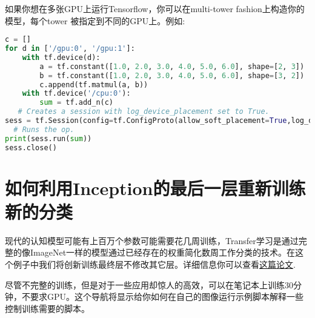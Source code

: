 如果你想在多张GPU上运行Tensorflow，你可以在multi-tower fashion上构造你的模型，每个tower 被指定到不同的GPU上。例如:
\begin{lstlisting}[language=Python]
c = []
for d in ['/gpu:0', '/gpu:1']:
    with tf.device(d):
        a = tf.constant([1.0, 2.0, 3.0, 4.0, 5.0, 6.0], shape=[2, 3])
        b = tf.constant([1.0, 2.0, 3.0, 4.0, 5.0, 6.0], shape=[3, 2])
        c.append(tf.matmul(a, b))
    with tf.device('/cpu:0'):
        sum = tf.add_n(c)
   # Creates a session with log_device_placement set to True.
sess = tf.Session(config=tf.ConfigProto(allow_soft_placement=True,log_device_placement=True))
  # Runs the op.
print(sess.run(sum))
sess.close()
\end{lstlisting}
\section{如何利用Inception的最后一层重新训练新的分类}
现代的认知模型可能有上百万个参数可能需要花几周训练，Transfer学习是通过完整的像ImageNet一样的模型通过已经存在的权重简化数周工作分类的技术。在这个例子中我们将创新训练最终层不修改其它层。详细信息你可以查看\href{http://arxiv.org/pdf/1310.1531v1.pdf}{这篇论文}.

尽管不完整的训练，但是对于一些应用却惊人的高效，可以在笔记本上训练30分钟，不要求GPU。这个导航将显示给你如何在自己的图像运行示例脚本解释一些控制训练需要的脚本。
